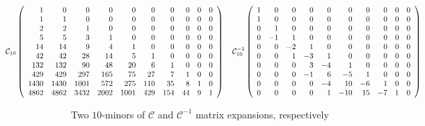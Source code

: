
\begin{table}
    \begin{displaymath} 
        \hspace{-3cm}
        \mathcal{C}_{10} \left(\begin{array}{rrrrrrrrrr}
        1 & 0 & 0 & 0 & 0 & 0 & 0 & 0 & 0 & 0 \\
        1 & 1 & 0 & 0 & 0 & 0 & 0 & 0 & 0 & 0 \\
        2 & 2 & 1 & 0 & 0 & 0 & 0 & 0 & 0 & 0 \\
        5 & 5 & 3 & 1 & 0 & 0 & 0 & 0 & 0 & 0 \\
        14 & 14 & 9 & 4 & 1 & 0 & 0 & 0 & 0 & 0 \\
        42 & 42 & 28 & 14 & 5 & 1 & 0 & 0 & 0 & 0 \\
        132 & 132 & 90 & 48 & 20 & 6 & 1 & 0 & 0 & 0 \\
        429 & 429 & 297 & 165 & 75 & 27 & 7 & 1 & 0 & 0 \\
        1430 & 1430 & 1001 & 572 & 275 & 110 & 35 & 8 & 1 & 0 \\
        4862 & 4862 & 3432 & 2002 & 1001 & 429 & 154 & 44 & 9 & 1
        \end{array}\right) 
        \quad
        \mathcal{C}_{10}^{-1}\left(\begin{array}{rrrrrrrrrr}
        1 & 0 & 0 & 0 & 0 & 0 & 0 & 0 & 0 & 0 \\
        1 & 0 & 0 & 0 & 0 & 0 & 0 & 0 & 0 & 0 \\
        0 & 1 & 0 & 0 & 0 & 0 & 0 & 0 & 0 & 0 \\
        0 & -1 & 1 & 0 & 0 & 0 & 0 & 0 & 0 & 0 \\
        0 & 0 & -2 & 1 & 0 & 0 & 0 & 0 & 0 & 0 \\
        0 & 0 & 1 & -3 & 1 & 0 & 0 & 0 & 0 & 0 \\
        0 & 0 & 0 & 3 & -4 & 1 & 0 & 0 & 0 & 0 \\
        0 & 0 & 0 & -1 & 6 & -5 & 1 & 0 & 0 & 0 \\
        0 & 0 & 0 & 0 & -4 & 10 & -6 & 1 & 0 & 0 \\
        0 & 0 & 0 & 0 & 1 & -10 & 15 & -7 & 1 & 0
        \end{array}\right)
    \end{displaymath}

  \caption[$\mathcal{C}$ and $\mathcal{C}^{-1}$]{Two $10$-minors of
  $\mathcal{C}$ and $\mathcal{C}^{-1}$ matrix expansions, respectively}

  \label{tab:catalan:array} 

\end{table}
